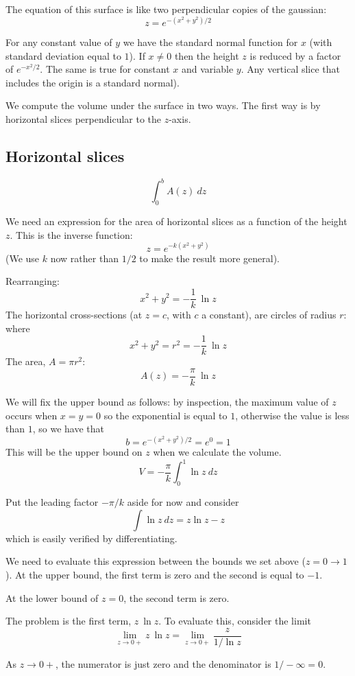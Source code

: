 \documentclass[11pt, oneside]{report}   	%
\begin{document}
The equation of this surface is like two perpendicular copies of the gaussian:
\[ z = e^{-(x^2 + y^2)/2} \]

For any constant value of $y$ we have the standard normal function for $x$ (with standard deviation equal to $1$).  If $x \ne 0$ then the height $z$ is reduced by a factor of $e^{-x^2/2}$.  The same is true for constant $x$ and variable $y$.  Any vertical slice that includes the origin is a standard normal).

We compute the volume under the surface in two ways.  The first way is by horizontal slices perpendicular to the $z$-axis.

\subsection*{Horizontal slices}
\[ \int_0^b A(z) \ dz \]

We need an expression for the area of horizontal slices as a function of the height $z$.  This is the inverse function:
\[ z = e^{-k(x^2 + y^2)} \]
(We use $k$ now rather than $1/2$ to make the result more general).

Rearranging:
\[ x^2 + y^2 = -\frac{1}{k} \ \ln z \]
The horizontal cross-sections (at $z = c$, with $c$ a constant), are circles of radius $r$: where
\[ x^2 + y^2 = r^2 = -\frac{1}{k} \ \ln z \]
The area, $A = \pi r^2$:
\[ A(z) = -\frac{\pi}{k} \ \ln z  \]

We will fix the upper bound as follows:  by inspection, the maximum value of $z$ occurs when $x=y=0$ so the exponential is equal to $1$, otherwise the value is less than $1$, so we have that 
\[  b = e^{-(x^2 + y^2)/2} = e^0 = 1 \]
This will be the upper bound on $z$ when we calculate the volume.
\[ V = -\frac{\pi}{k} \int_0^1 \ln z \ dz \]

Put the leading factor $-\pi/k$ aside for now and consider
\[ \int \ln z \ dz = z \ln z - z \]
which is easily verified by differentiating.

We need to evaluate this expression between the bounds we set above ($z=0 \rightarrow 1$).  At the upper bound, the first term is zero and the second is equal to $-1$.

At the lower bound of $z=0$,  the second term is zero.
  
The problem is the first term, $z \ \ln z$.  To evaluate this, consider the limit
\[ \lim_{z \rightarrow 0+}  z \ \ln z = \lim_{z \rightarrow 0+}   \frac{z}{1/\ln z} \]

As $z \rightarrow 0+$, the numerator is just zero and the denominator is $1/-\infty = 0$.  
\end{document}
